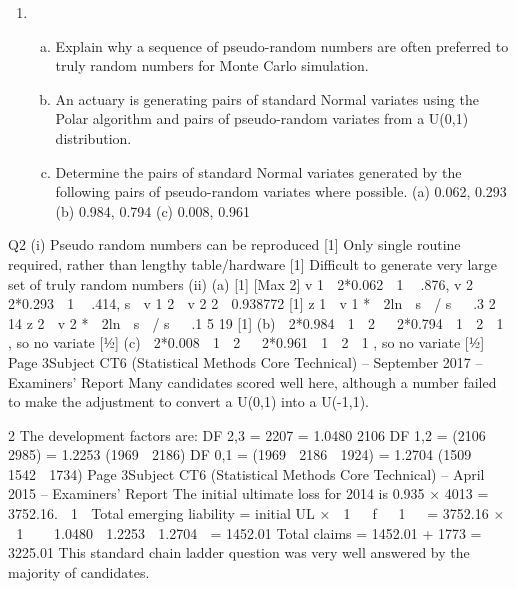 \documentclass[a4paper,12pt]{article}
\begin{document}
\begin{enumerate}


\item 

\begin{enumerate}[(a)]  
\item Explain why a sequence of pseudo-random numbers are often preferred to
truly random numbers for Monte Carlo simulation.

\item An actuary is generating pairs of standard Normal variates using the Polar algorithm
and pairs of pseudo-random variates from a U(0,1) distribution.
\item 
Determine the pairs of standard Normal variates generated by the following
pairs of pseudo-random variates where possible.
(a) 0.062, 0.293
(b) 0.984, 0.794
(c) 0.008, 0.961
\end{enumerate}
\end{enumerate}
\newpage

Q2
(i)
Pseudo random numbers can be reproduced [1]
Only single routine required, rather than lengthy table/hardware [1]
Difficult to generate very large set of truly random numbers
(ii)
(a)
[1]
[Max 2]
v 1  2*0.062  1  .876, v 2  2*0.293  1  .414,
s  v 1 2  v 2 2  0.938772
[1]
z 1  v 1 *  2ln  s  / s   .3 2 14
z 2  v 2 *  2ln  s  / s   .1 5 19 [1]
(b)  2*0.984  1  2   2*0.794  1  2  1 , so no variate [1⁄2]
(c)  2*0.008  1  2   2*0.961  1  2  1 , so no variate [1⁄2]
Page 3Subject CT6 (Statistical Methods Core Technical) – September 2017 – Examiners’ Report
Many candidates scored well here, although a number failed to make
the adjustment to convert a U(0,1) into a U(-1,1).


2
The development factors are:
DF 2,3 = 2207
= 1.0480
2106
DF 1,2 = (2106  2985)
= 1.2253
(1969  2186)
DF 0,1 = (1969  2186  1924)
= 1.2704
(1509  1542  1734)
Page 3Subject CT6 (Statistical Methods Core Technical) – April 2015 – Examiners’ Report
The initial ultimate loss for 2014 is 0.935 × 4013 = 3752.16.
 1 
Total emerging liability = initial UL ×  1  
f 

1


= 3752.16 ×  1 

 1.0480  1.2253  1.2704 
= 1452.01
Total claims = 1452.01 + 1773
= 3225.01
This standard chain ladder question was very well answered by the majority of candidates.
\end{document}
